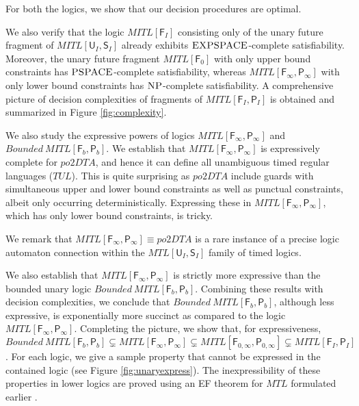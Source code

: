 \documentclass{llncs}
\newcommand{\class}{\textsc}
\newcommand{\until}{\textsf{U}}
\newcommand{\since}{\textsf{S}}
\newcommand{\fut}{\textsf{F}}
\newcommand{\past}{\textsf{P}}
\newcommand{\oomit}[1]{}
\newcommand{\mtlus}{\mbox{$\mathit{MTL[\until_I,\since_I]}$}}
\newcommand{\mitlus}{\mbox{$\mathit{MITL[\until_I,\since_I]}$}}
\newcommand{\mitlfp}{\mbox{$\mathit{MITL[\fut_I,\past_I]}$}}
\newcommand{\bmitlfp}{\mbox{$\mathit{Bounded ~MITL[\fut_b,\past_b]}$}}
\newcommand{\tptlus}{\mbox{$\mathit{TPTL[\until,\since]}$}}
\newcommand{\potdta}{\mbox{$\mathit{po2DTA}$}}
\newcommand{\ttlxy}{\mbox{$\mathit{TTL}[X_\theta,Y_\theta]$}}
\newcommand{\mitlf}{\mbox{$\mathit{MITL[\fut_I]}$}}
\newcommand{\mitlfpinf}{\mbox{$\mathit{MITL[\fut_\infty,\past_\infty]}$}}
\newcommand{\mitlfpb}{\bmitlfp}
\newcommand{\mitl}{\mbox{$\mathit{MITL}$}}
\newcommand{\mtl}{\mbox{$\mathit{MTL}$}}
\newcommand{\mitlfpzinf}{\mbox{$\mathit{MITL[\fut_{0,\infty},\past_{0,\infty}]}$}}
\newcommand{\mitlfz}{\mbox{$\mathit{MITL[\fut_{0}]}$}}
\newcommand{\pspace}{\mbox{$\class{PSPACE}$}}
\newcommand{\expspace}{\mbox{$\class{EXPSPACE}$}}
\newcommand{\np}{\mbox{$\class{NP}$}}
\newcommand{\tul}{\mbox{$\mathit{TUL}$}}
\begin{document}
For both the logics, we show that  our decision procedures are optimal.
\oomit{ the hardness of these and other related logics is established by reduction of a suitable tiling problem to the satisfiability of the concerned unary \mitl\/ fragment.}  
We also verify that the logic $\mitlf$ consisting only of the unary future fragment of $\mitlus$  already exhibits \expspace-complete satisfiability. Moreover, the unary future fragment $\mitlfz$ with only upper bound constraints has \pspace-complete satisfiability, whereas  $\mitlfpinf$ with only lower bound constraints has \np-complete satisfiability.
A comprehensive picture of decision complexities of fragments of $\mitlfp$ is obtained and summarized in Figure \ref{fig:complexity}.

We also study the expressive powers of logics \mitlfpinf\/ and \mitlfpb.
We establish that \mitlfpinf\/  is expressively complete for \potdta, and hence it can define all unambiguous timed regular languages (\tul). 
This is quite  surprising as $\potdta$ include guards with simultaneous upper and lower bound constraints as well as punctual constraints, albeit only occurring deterministically. Expressing these in $\mitlfpinf$, which has only lower bound constraints, is tricky.
\oomit{This \ttlxy\/ logic embodies the freeze quantification (of \tptlus)  and it has both punctual and unbounded constraints, albeit occurring only within deterministic modalities. 
We now show that  $\mitlfpinf$ can express all $\ttlxy$ formulas, and the two logics are expressively equivalent. The reduction from $\ttlxy$ to \mitlfpinf\/ is a variant of another such encoding into the more expressive logic \mitlfp\/ given earlier (see \cite{PS11}).}
We remark that $\mitlfpinf \equiv \potdta$ is a rare instance of a precise logic automaton connection within the \mtlus\/ family of timed logics.


We also establish that  $\mitlfpinf$ is strictly more expressive than the bounded unary logic $\mitlfpb$. Combining these results with decision complexities, we conclude that $\mitlfpb$, although less expressive, is exponentially more succinct as compared to the logic $\mitlfpinf$. Completing the picture, we show that, for expressiveness, $\mitlfpb \subsetneq \mitlfpinf \subsetneq \mitlfpzinf \subsetneq \mitlfp$. For each logic, we give a sample property that cannot be expressed in the contained logic (see Figure \ref{fig:unaryexpress}). The inexpressibility of these properties in lower logics are proved using an EF theorem for $\mtl$ formulated earlier \cite{PS11}. 
\end{document}
